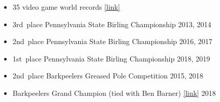 \documentclass{article}
\begin{document}
\begin{itemize}
  \item 35 video game world records \href{https://www.twingalaxies.com/scores.php?player=43761}{[link]} \hfill {}
  \item 3rd~place Pennsylvania State Birling Championship \hfill 2013, 2014
  \item 2nd~place Pennsylvania State Birling Championship \hfill 2016, 2017
  \item 1st~place Pennsylvania State Birling Championship \hfill 2018, 2019
  \item 2nd~place Barkpeelers Greased Pole Competition \hfill 2015, 2018
  \item Barkpeelers Grand Champion (tied with Ben Barner) \href{http://lumbermuseum.org/bark-peeler-festival/festival-events-2019/bark-peeler-festival-2018/}{[link]} \hfill 2018
\end{itemize}
\end{document}
